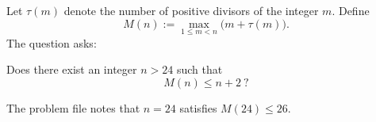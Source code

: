 Let $\tau(m)$ denote the number of positive divisors of the integer $m$.
Define
\[
M(n):=\max_{1\le m<n}\bigl(m+\tau(m)\bigr).
\]
The question asks:

\medskip
\noindent Does there exist an integer $n>24$ such that
\[
M(n)\le n+2\ ?
\]

The problem file notes that $n=24$ satisfies $M(24)\le 26$.
